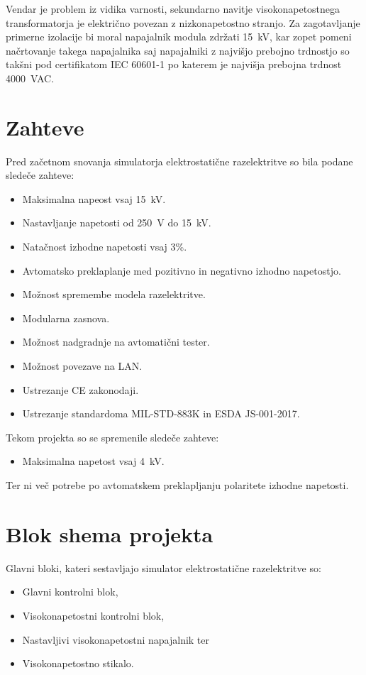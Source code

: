 \documentclass[a4paper,twoside,openright,12pt,slovene]{book}
\begin{document}
Vendar je problem iz vidika varnosti, sekundarno navitje visokonapetostnega transformatorja je električno povezan z nizkonapetostno stranjo. Za zagotavljanje primerne izolacije bi moral napajalnik modula zdržati \SI{15}{\kilo\volt}, kar zopet pomeni načrtovanje takega napajalnika saj napajalniki z najvišjo prebojno trdnostjo so takšni pod certifikatom IEC 60601-1 po katerem je najvišja prebojna trdnost \SI{4000}{\volt}AC.
    
\chapter{Zahteve} \label{Zahteve}

Pred začetnom snovanja simulatorja elektrostatične razelektritve so bila podane sledeče zahteve:
\begin{itemize}
\item Maksimalna napeost vsaj \SI{15}{\kilo\volt}.
\item Nastavljanje napetosti od \SI{250}{\volt} do \SI{15}{\kilo\volt}.
\item Natačnost izhodne napetosti vsaj 3\%.
\item Avtomatsko preklaplanje med pozitivno in negativno izhodno napetostjo.
\item Možnost spremembe modela razelektritve.
\item Modularna zasnova.
\item Možnost nadgradnje na avtomatični tester.
\item Možnost povezave na LAN.
\item Ustrezanje CE zakonodaji.
\item Ustrezanje standardoma MIL-STD-883K in ESDA JS-001-2017.
\end{itemize}

Tekom projekta so se spremenile sledeče zahteve:
\begin{itemize}
\item Maksimalna napetost vsaj \SI{4}{\kilo\volt}.
\end{itemize}
Ter ni več potrebe po avtomatskem preklapljanju polaritete izhodne napetosti.

\chapter{Blok shema projekta} \label{blokshemaprojekta}

Glavni bloki, kateri sestavljajo simulator elektrostatične razelektritve so:
\begin{itemize}
\item Glavni kontrolni blok,
\item Visokonapetostni kontrolni blok,
\item Nastavljivi visokonapetostni napajalnik ter
\item Visokonapetostno stikalo.
\end{itemize}
\end{document}
